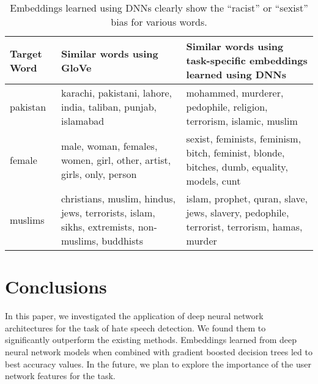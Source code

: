 \documentclass[letterpaper]{sig-alternate-2013}
\begin{document}
\begin{table}%
	\centering
	\scriptsize
	\caption{\scriptsize Embeddings learned using DNNs clearly show the ``racist'' or ``sexist'' bias for various words.}
	\vspace{-0.6pc}
	\label{tab:caseStudies}
	\begin{tabular}{|p{2.5pc}|p{8pc}|p{8pc}|}
		\hline
		Target Word&Similar words using GloVe&Similar words using task-specific embeddings learned using DNNs \\
		\hline
		\hline
		pakistan&karachi, pakistani, lahore, india, taliban, punjab, islamabad&mohammed, murderer, pedophile, religion, terrorism, islamic, muslim\\
		\hline
		female&male, woman, females, women, girl, other, artist, girls, only, person&sexist, feminists, feminism, bitch, feminist, blonde, bitches, dumb, equality, models, cunt\\
		\hline
		muslims&christians, muslim, hindus, jews, terrorists, islam, sikhs, extremists, non-muslims, buddhists&islam, prophet, quran, slave, jews, slavery, pedophile, terrorist, terrorism, hamas, murder\\
		\hline
	\end{tabular}
	
\end{table} 


\section{Conclusions}
In this paper, we investigated the application of deep neural network architectures for the task of hate speech detection. We found them to significantly outperform the existing methods. Embeddings learned from deep neural network models when combined with gradient boosted decision trees led to best accuracy values. In the future, we plan to explore the importance of the user network features for the task.



\scriptsize
%
\end{document}
